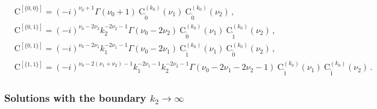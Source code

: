 \documentclass[a4paper,11pt]{article}
\newcommand{\nn}{\nonumber}
\begin{document}
\begin{align}
&\text{C}^{[\{0,0\}]}=(-i)^{\nu _0+1} \Gamma \left(\nu _0+1\right) ~ \text{C}_{\tilde{0}}^{(k_0)}(\nu_1)~ \text{C}_{\tilde{0}}^{(k_0)}(\nu_2) \, , \nn\\
&\text{C}^{[\{0,1\}]}=(-i)^{\nu _0-2 \nu _2} k_2^{-2 \nu _2-1} \Gamma \left(\nu _0-2 \nu _2\right) ~ \text{C}_{\tilde{0}}^{(k_0)}(\nu_1)~ \text{C}_{\tilde{1}}^{(k_0)}(\nu_2) \, , \nn\\
&\text{C}^{[\{0,1\}]}=(-i)^{\nu _0-2 \nu _1} k_1^{-2 \nu _1-1} \Gamma \left(\nu _0-2 \nu _1\right) ~ \text{C}_{\tilde{1}}^{(k_0)}(\nu_1)~ \text{C}_{\tilde{0}}^{(k_0)}(\nu_2) \, ,\nn\\
&\text{C}^{[\{1,1\}]}= (-i)^{\nu _0-2 \left(\nu _1+\nu _2\right)-1} k_1^{-2 \nu _1-1} k_2^{-2 \nu _2-1} \Gamma \left(\nu _0-2 \nu _1-2\nu _2-1\right) ~ \text{C}_{\tilde{1}}^{(k_0)}(\nu_1)~ \text{C}_{\tilde{1}}^{(k_0)}(\nu_2) \, .
\end{align}


\subsubsection{Solutions with the boundary $k_2\to\infty$}
\end{document}
